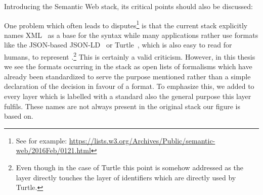 % 
% 
% 
% 
% 
% 
Introducing the Semantic Web stack, its critical points should also be discussed:


One problem which often leads to disputes\footnote{See for example: \url{https://lists.w3.org/Archives/Public/semantic-web/2016Feb/0121.html}} 
is that the current stack explicitly names XML~\cite{XML} as a base for the syntax while many applications rather use formats like 
the JSON-based JSON-LD~\cite{jsonld} or Turtle~\cite{turtle}, 
which is also easy to read for humans, to represent \rdf.\footnote{Even though in the case of Turtle this point 
is somehow addressed as the \rdf layer directly 
touches the layer of identifiers which are directly used by Turtle.} This is certainly a valid criticism. 
However, in this thesis we see the formats occurring in the stack as open lists of formalisms which have already been standardized to serve the purpose mentioned 
rather than a simple declaration of the decision in favour of a format. To emphasize this, we added to every layer which is labelled with a standard also the general purpose this layer 
fulfils. These names are not always present in the original stack our figure is based on.


